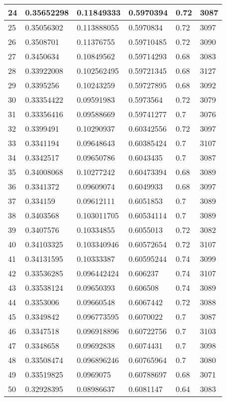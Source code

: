 \begin{longtable}{|l|l|l|l|l|l|}
24 & 0.35652298 & 0.11849333 & 0.5970394 & 0.72 & 3087 \\ \hline 
25 & 0.35056302 & 0.113888055 & 0.5970834 & 0.72 & 3097 \\ \hline 
26 & 0.3508701 & 0.11376755 & 0.59710485 & 0.72 & 3090 \\ \hline 
27 & 0.3450634 & 0.10849562 & 0.59714293 & 0.68 & 3083 \\ \hline 
28 & 0.33922008 & 0.102562495 & 0.59721345 & 0.68 & 3127 \\ \hline 
29 & 0.3395256 & 0.10243259 & 0.59727895 & 0.68 & 3092 \\ \hline 
30 & 0.33354422 & 0.09591983 & 0.5973564 & 0.72 & 3079 \\ \hline 
31 & 0.33356416 & 0.09588669 & 0.59741277 & 0.7 & 3076 \\ \hline 
32 & 0.3399491 & 0.10290937 & 0.60342556 & 0.72 & 3097 \\ \hline 
33 & 0.3341194 & 0.09648643 & 0.60385424 & 0.7 & 3107 \\ \hline 
34 & 0.3342517 & 0.09650786 & 0.6043435 & 0.7 & 3087 \\ \hline 
35 & 0.34008068 & 0.10277242 & 0.60473394 & 0.68 & 3089 \\ \hline 
36 & 0.3341372 & 0.09609074 & 0.6049933 & 0.68 & 3097 \\ \hline 
37 & 0.334159 & 0.09612111 & 0.6051853 & 0.7 & 3089 \\ \hline 
38 & 0.3403568 & 0.103011705 & 0.60534114 & 0.7 & 3089 \\ \hline 
39 & 0.3407576 & 0.10334855 & 0.6055013 & 0.72 & 3082 \\ \hline 
40 & 0.34103325 & 0.103340946 & 0.60572654 & 0.72 & 3107 \\ \hline 
41 & 0.34131595 & 0.10333387 & 0.60595244 & 0.74 & 3099 \\ \hline 
42 & 0.33536285 & 0.096442424 & 0.606237 & 0.74 & 3107 \\ \hline 
43 & 0.33538124 & 0.09650393 & 0.606508 & 0.74 & 3089 \\ \hline 
44 & 0.3353006 & 0.09660548 & 0.6067442 & 0.72 & 3088 \\ \hline 
45 & 0.3349842 & 0.096773595 & 0.6070022 & 0.7 & 3087 \\ \hline 
46 & 0.3347518 & 0.096918896 & 0.60722756 & 0.7 & 3103 \\ \hline 
47 & 0.3348658 & 0.09692838 & 0.6074431 & 0.7 & 3098 \\ \hline 
48 & 0.33508474 & 0.096896246 & 0.60765964 & 0.7 & 3080 \\ \hline 
49 & 0.33519825 & 0.0969075 & 0.60788697 & 0.68 & 3071 \\ \hline 
50 & 0.32928395 & 0.08986637 & 0.6081147 & 0.64 & 3083 \\ \hline 
\end{longtable}